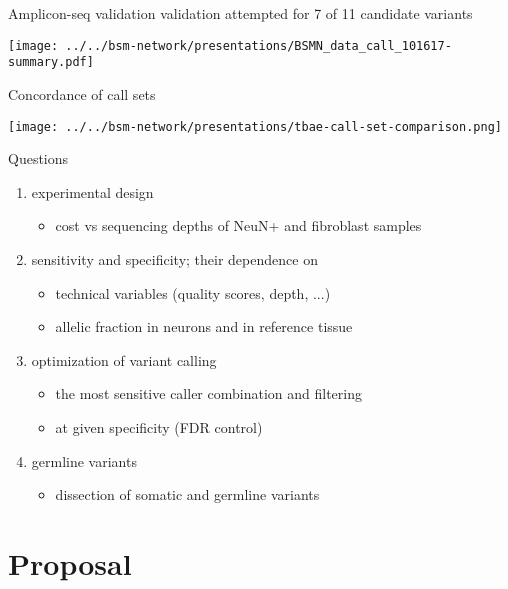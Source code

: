 \documentclass{beamer}
\begin{document}
\begin{frame}{Amplicon-seq validation}
{validation attempted for 7 of 11 candidate variants}
\begin{center}
\texttt{[image: ../../bsm-network/presentations/BSMN\_data\_call\_101617-summary.pdf]}
\end{center}
\end{frame}

\begin{frame}{Concordance of call sets}
\begin{center}
\texttt{[image: ../../bsm-network/presentations/tbae-call-set-comparison.png]}
\end{center}
\end{frame}

\begin{frame}{Questions}
\begin{enumerate}
\item experimental design
\begin{itemize}
\item cost vs sequencing depths of NeuN+ and fibroblast samples
\end{itemize}
\item sensitivity and specificity; their dependence on
\begin{itemize}
\item technical variables (quality scores, depth, ...)
\item allelic fraction in neurons and in reference tissue
\end{itemize}
\item optimization of variant calling
\begin{itemize}
\item the most sensitive caller combination and filtering
\item at given specificity (FDR control)
\end{itemize}
\item germline variants
\begin{itemize}
\item dissection of somatic and germline variants
\end{itemize}
\end{enumerate}
\end{frame}

\section{Proposal}
\end{document}

